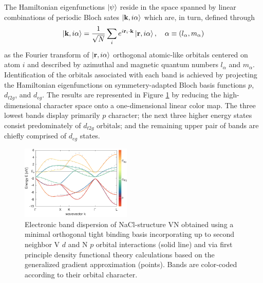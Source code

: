\documentclass[twocolumn,showpacs,preprintnumbers,superscriptaddress,prb,floatfix,aps,10pt]{revtex4-1}
\renewcommand{\vec}[1]{\ensuremath{\mathbf{#1}}}
\newcommand*{\bloch}{\ket{\vec{k}, i\alpha}}
\newcommand*{\lowdin}{\ket{\vec{r}, i\alpha}}
\begin{document}
The Hamiltonian eigenfunctions $\ket{\psi}$ reside in the space spanned by linear combinations of periodic Bloch sates $\bloch$ which are, in turn, defined through 
\begin{equation}
\label{eq:bloch}
\bloch = \frac{1}{\sqrt{N}} \sum_i e^{i\vec{r}_i\cdot\vec{k}} \lowdin, 
\quad
\alpha \equiv (l_\alpha,m_\alpha)
\end{equation}
as the Fourier transform of $\lowdin$ orthogonal atomic-like orbitals centered on atom $i$ and described by azimuthal and magnetic quantum numbers $l_\alpha$ and $m_\alpha$. Identification of the orbitals associated with each band is achieved by projecting the Hamiltonian eigenfunctions on symmetery-adapted Bloch basis functions $p$, $d_{t2g}$, and $d_{eg}$. The results are represented in Figure \ref{fig:dispersion} by reducing the high-dimensional character space onto a one-dimensional linear color map. The three lowest bands display primarily $p$ character; the next three higher energy states consist predominately of $d_{t2g}$ orbitals; and the remaining upper pair of bands are chiefly comprised of $d_{eg}$ states.
%
\begin{figure}[h]
\includegraphics[width=0.47\textwidth]{Figure_1_bands.pdf}
\caption{\label{fig:dispersion} Electronic band dispersion of NaCl-structure VN obtained using a minimal orthogonal tight binding basis incorporating up to second neighbor V $d$ and N $p$ orbital interactions (solid line) and via first principle density functional theory calculations based on the generalized gradient approximation (points). Bands are color-coded according to their orbital character.}
\end{figure}
\end{document}
